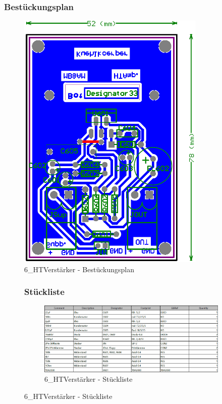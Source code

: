 \subsubsection*{Bestückungsplan}
	\begin{figure} [H]
		\centering
		\includegraphics[width=0.8\textwidth]{img/Print6/HTVerstaerker-Best.png}
		\caption{6\_HTVerstärker - Bestückungsplan}
		\label {fig:8.10.20}
	\end{figure}

\begin{figure}
	\subsubsection*{Stückliste}
	\begin{figure} [H]
		\centering
		\includegraphics[width=1\textwidth]{img/Print6/HTVerstaerker-Blist.png}
		\caption{6\_HTVerstärker - Stückliste}
		\label {fig:8.10.21}
	\end{figure}
\end{figure}






